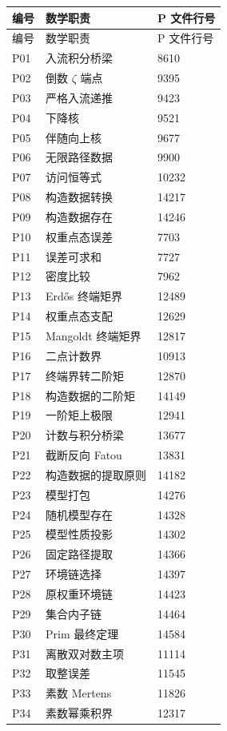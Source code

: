 {\footnotesize
\begin{longtable}{@{}p{.10\linewidth}p{.66\linewidth}p{.16\linewidth}@{}}
\toprule 编号 & 数学职责 & P 文件行号\\\midrule
\endfirsthead
\toprule 编号 & 数学职责 & P 文件行号\\\midrule
\endhead
P01 & 入流积分桥梁 & 8610\\
P02 & 倒数 $\zeta$ 端点 & 9395\\
P03 & 严格入流递推 & 9423\\
P04 & 下降核 & 9521\\
P05 & 伴随向上核 & 9677\\
P06 & 无限路径数据 & 9900\\
P07 & 访问恒等式 & 10232\\
P08 & 构造数据转换 & 14217\\
P09 & 构造数据存在 & 14246\\
P10 & 权重点态误差 & 7703\\
P11 & 误差可求和 & 7727\\
P12 & 密度比较 & 7962\\
P13 & Erdős 终端矩界 & 12489\\
P14 & 权重点态支配 & 12629\\
P15 & Mangoldt 终端矩界 & 12817\\
P16 & 二点计数界 & 10913\\
P17 & 终端界转二阶矩 & 12870\\
P18 & 构造数据的二阶矩 & 14149\\
P19 & 一阶矩上极限 & 12941\\
P20 & 计数与积分桥梁 & 13677\\
P21 & 截断反向 Fatou & 13831\\
P22 & 构造数据的提取原则 & 14182\\
P23 & 模型打包 & 14276\\
P24 & 随机模型存在 & 14328\\
P25 & 模型性质投影 & 14302\\
P26 & 固定路径提取 & 14366\\
P27 & 环境链选择 & 14397\\
P28 & 原权重环境链 & 14423\\
P29 & 集合内子链 & 14464\\
P30 & Prim 最终定理 & 14584\\
P31 & 离散双对数主项 & 11114\\
P32 & 取整误差 & 11545\\
P33 & 素数 Mertens & 11826\\
P34 & 素数幂乘积界 & 12317\\
\bottomrule
\end{longtable}}


